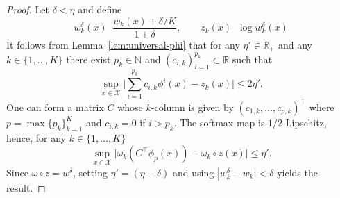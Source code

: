 \documentclass{article}
\DeclareMathOperator*{\eqdef }{\,\stackrel{\text{def}}{=}\,}
\newcommand{\R}{\mathbb{R}}
\begin{document}
\begin{proof}
Let $\delta < \eta$ and define
\[ w^\delta_k(x) \eqdef \frac{w_k(x)+\delta/K}{1+\delta}, \quad \quad  z_k(x) \eqdef \log w^\delta_k(x)\]
It follows from Lemma~\ref{lem:universal-phi} that for any $\eta' \in \R_+$  and any $k \in \{1, \ldots, K\}$ there exist $p_k \in \mathbb{N}$ and $(c_{i,k})_{i=1}^{p_k} \subset \R$ such that
\[ \sup_{x \in \mathcal{X}} \Big\vert \sum_{i=1}^{p_k} c_{i,k} \phi^i(x) - z_k(x) \Big\vert \le 2\eta'.\]
One can form a matrix $C$ whose $k$-column is given by $(c_{1,k},\ldots,c_{p,k})^\top$ where $p = \max \{ p_k \}_{k=1}^K$ and $c_{i,k} = 0$ if $i > p_k$.
The softmax map is $1/2$-Lipschitz, hence, for any $k \in \{1,\ldots, K\}$
\[ \sup_{x \in \mathcal{X}} \big| \omega_k(C^\top\phi_p(x))-\omega_k\circ z(x) \big| \le \eta'. \]
Since $\omega \circ z = w^\delta$, setting $\eta'= (\eta - \delta) $ and using $|w_k^\delta - w_k| < \delta$ yields the result.
\end{proof}
\end{document}
